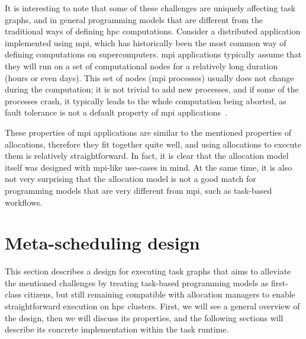 It is interesting to note that some of these challenges are uniquely affecting task graphs, and in
general programming models that are different from the traditional ways of defining
\gls{hpc} computations. Consider a distributed application implemented using
\gls{mpi}, which has historically been the most common way of defining computations
on supercomputers. \gls{mpi} applications typically assume that they will run on a set
of computational nodes for a relatively long duration (hours or even days). This set of nodes
(\gls{mpi} processes) usually does not change during the computation; it is not
trivial to add new processes, and if some of the processes crash, it typically leads to the whole
computation being aborted, as fault tolerance is not a default property of \gls{mpi}
applications~\cite{fault_tolerant_mpi}.

These properties of \gls{mpi} applications are similar to the mentioned properties of
allocations, therefore they fit together quite well, and using allocations to execute them is
relatively straightforward. In fact, it is clear that the allocation model itself was designed with
\gls{mpi}-like use-cases in mind. At the same time, it is also not very surprising
that the allocation model is not a good match for programming models that are very different from
\gls{mpi}, such as task-based workflows.



\section{Meta-scheduling design}
This section describes a design for executing task graphs that aims to alleviate the mentioned
challenges by treating task-based programming models as first-class citizens, but still remaining
compatible with allocation managers to enable straightforward execution on \gls{hpc}
clusters. First, we will see a general overview of the design, then we will discuss its properties,
and the following sections will describe its concrete implementation within the
\hyperqueue{} task runtime.

